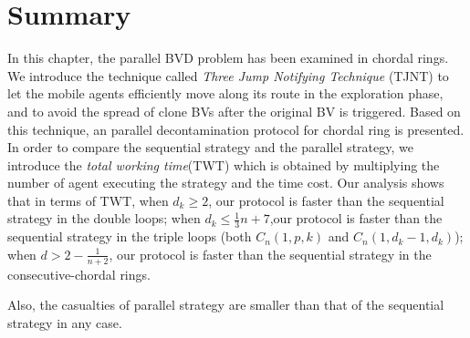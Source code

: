 \color{blue}
\section{Summary}
In this chapter, the parallel BVD problem has been examined in chordal rings. We introduce the technique called  {\em Three Jump Notifying Technique} (TJNT) to let the mobile agents efficiently move along its route in the exploration phase, and to avoid the spread of clone BVs after the original BV is triggered. Based on this technique, an parallel decontamination protocol for chordal ring is presented. In order to compare the sequential strategy and the parallel strategy, we introduce the {\em total working time}(TWT) which is obtained by multiplying the number of agent executing the strategy and the time cost. Our analysis shows that in terms of TWT, when $d_k\geq 2$, our protocol is faster than the sequential strategy in the double loops; when $d_k\leq \frac{1}{3}n+7$,our protocol is faster than the sequential strategy in the triple loops (both $C_n(1,p,k)$ and $C_n(1,d_k-1,d_k)$); when $d>2-\frac{1}{n+2}$, our protocol is faster than the sequential strategy in the consecutive-chordal rings.

Also, the casualties of parallel strategy are smaller than that of the sequential strategy in any case.
\color{black}













